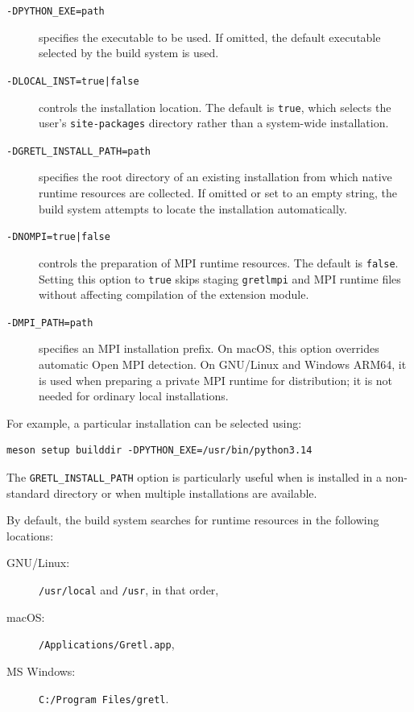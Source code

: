 \begin{description}
	\item[\texttt{-DPYTHON\_EXE=path}] specifies the \python
		executable to be used. If omitted, the default executable
		selected by the build system is used.
	\item[\texttt{-DLOCAL\_INST=true|false}] controls the
		installation location. The default is \texttt{true},
		which selects the user's \python \texttt{site-packages}
		directory rather than a system-wide installation.
	\item[\texttt{-DGRETL\_INSTALL\_PATH=path}] specifies the
		root directory of an existing \gretl installation from
		which native runtime resources are collected. If omitted
		or set to an empty string, the build system attempts to
		locate the installation automatically.
	\item[\texttt{-DNOMPI=true|false}] controls the preparation
		of MPI runtime resources. The default is \texttt{false}.
		Setting this option to \texttt{true} skips staging
		\texttt{gretlmpi} and MPI runtime files without affecting
		compilation of the \gretlpy extension module.
	\item[\texttt{-DMPI\_PATH=path}] specifies an MPI installation
		prefix. On macOS, this option overrides automatic Open MPI
		detection. On GNU/Linux and Windows ARM64, it is used
		when preparing a private MPI runtime for distribution;
		it is not needed for ordinary local installations.
\end{description}

For example, a particular \python installation can be selected
using:

\begin{verbatim}
meson setup builddir -DPYTHON_EXE=/usr/bin/python3.14
\end{verbatim}

The \texttt{GRETL\_INSTALL\_PATH} option is particularly useful
when \gretl is installed in a non-standard directory or when
multiple installations are available.

By default, the build system searches for \gretl runtime
resources in the following locations:

\begin{description}
	\item[GNU/Linux:] \texttt{/usr/local} and \texttt{/usr}, in that order,
	\item[macOS:] \texttt{/Applications/Gretl.app},
	\item[MS Windows:] \texttt{C:/Program Files/gretl}.
\end{description}

